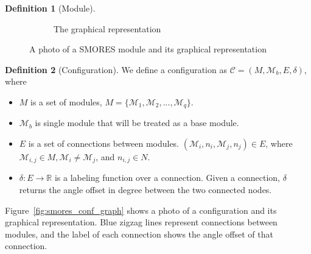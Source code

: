 \documentclass[conference]{IEEEtran}
\theoremstyle{definition}
\newtheorem{definition}{Definition}[section]
\begin{document}
\begin{definition}[Module]
\begin{figure}
\begin{center}
\begin{subfigure}[b]{0.4\columnwidth}
                \caption{The graphical representation}
                \label{fig:smores_graph}
        \end{subfigure}
\end{center}
\caption{A photo of a SMORES module and its graphical representation}
\label{fig:smores}
\end{figure}
\end{definition}

\begin{definition}[Configuration] 
We define a configuration as $\mathcal{C}=(M, \mathcal{M}_b, E, \delta)$, where
\begin{itemize}
\item $M$ is a set of modules, $M=\{\mathcal{M}_1, \mathcal{M}_2, ..., \mathcal{M}_q\}$.
\item $\mathcal{M}_b$ is single module that will be treated as a base module.
\item $E$ is a set of connections between modules. $(\mathcal{M}_i, n_i,
\mathcal{M}_j, n_j)\in E$, where $\mathcal{M}_{i,j} \in M, \mathcal{M}_i \neq
\mathcal{M}_j$, and $n_{i,j}\in N$.
\item $\delta: E \rightarrow \mathbb{R}$ is a labeling function over a
connection. Given a connection, $\delta$ returns the angle offset in degree
between the two connected nodes.
\end{itemize}
Figure~\ref{fig:smores_conf_graph} shows a photo of a configuration and its
graphical representation. Blue zigzag lines represent connections between
modules, and the label of each connection shows the angle offset of that
connection.
\end{definition}
\end{document}
